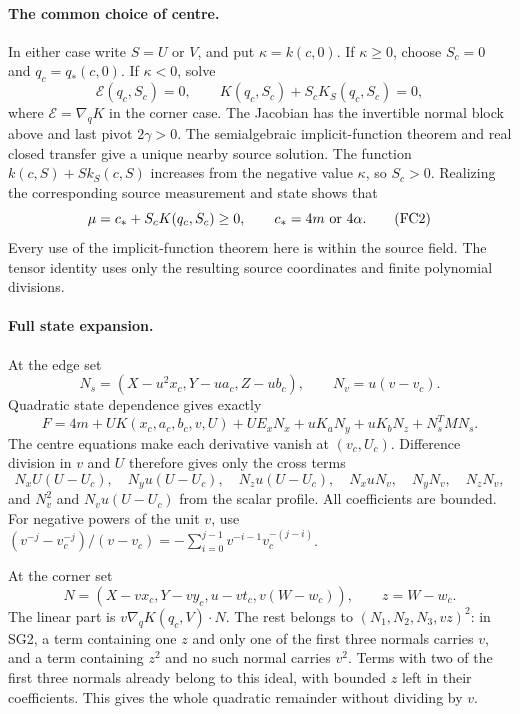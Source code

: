 \paragraph{The common choice of centre.}
In either case write $S=U$ or $V$, and put $\kappa=k(c,0)$.
If $\kappa\ge0$, choose $S_c=0$ and $q_c=q_*(c,0)$.
If $\kappa<0$, solve
\[
 \mathcal E(q_c,S_c)=0,\qquad
 K(q_c,S_c)+S_cK_S(q_c,S_c)=0,
 \tag{FC1}
\]
where $\mathcal E=\nabla_qK$ in the corner case. The Jacobian
has the invertible normal block above and last pivot $2\gamma>0$.
The semialgebraic implicit-function theorem and real closed transfer
give a unique nearby source solution. The function
$k(c,S)+Sk_S(c,S)$ increases from the negative value $\kappa$,
so $S_c>0$. Realizing the corresponding source measurement and
state shows that
\[
 \mu=c_*+S_cK(q_c,S_c)\ge0,
 \qquad c_*=4m\ \hbox{or}\ 4\alpha.
 \tag{FC2}
\]
Every use of the implicit-function theorem here is within the
source field. The tensor identity uses only the resulting source
coordinates and finite polynomial divisions.

\paragraph{Full state expansion.}
At the edge set
\[
 N_s=(X-u^2x_c,Y-ua_c,Z-ub_c),\qquad N_v=u(v-v_c).
\]
Quadratic state dependence gives exactly
\[
 F=4m+UK(x_c,a_c,b_c,v,U)
       +UE_xN_x+uK_aN_y+uK_bN_z+N_s^TMN_s.
\]
The centre equations make each derivative vanish at $(v_c,U_c)$.
Difference division in $v$ and $U$ therefore gives only the
cross terms
\[
 N_xU(U-U_c),\quad N_yu(U-U_c),\quad N_zu(U-U_c),
 \quad N_xuN_v,\quad N_yN_v,\quad N_zN_v,
\]
and $N_v^2$ and $N_vu(U-U_c)$ from the scalar profile.
All coefficients are bounded. For negative powers of the unit
$v$, use $(v^{-j}-v_c^{-j})/(v-v_c)
=-\sum_{i=0}^{j-1}v^{-i-1}v_c^{-(j-i)}$.

At the corner set
\[
 N=(X-vx_c,Y-vy_c,u-vt_c,v(W-w_c)),\qquad z=W-w_c.
\]
The linear part is $v\nabla_qK(q_c,V)\cdot N$.
The rest belongs to $(N_1,N_2,N_3,vz)^2$: in SG2, a term
containing one $z$ and only one of the first three normals carries
$v$, and a term containing $z^2$ and no such normal carries $v^2$.
Terms with two of the first three normals already belong to this
ideal, with bounded $z$ left in their coefficients. This gives the
whole quadratic remainder without dividing by $v$.

